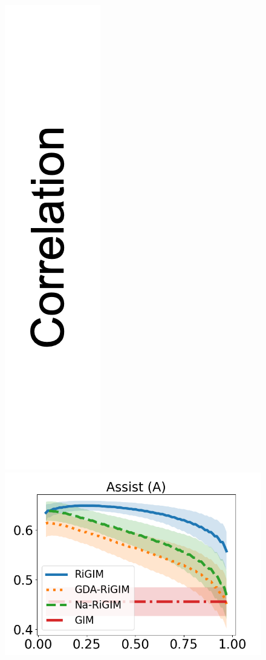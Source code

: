 \documentclass{article}
\begin{document}
\begin{figure}[htbp]
\vspace{-0.1in}
    \begin{minipage}{0.01\textwidth}
    \centering
    \includegraphics[scale=0.12]{figures/correlation_y_label.png}
    \end{minipage}
    \begin{minipage}{0.16\textwidth}
    \centering
    \includegraphics[scale=0.14]{figures/risk_curve_A_shadow.png}\par

\end{minipage}
\end{figure}
\end{document}

